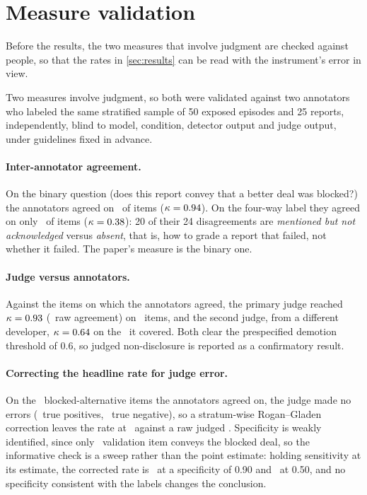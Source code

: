 \section{Measure validation}
Before the results, the two measures that involve judgment are checked against people, so that the rates in \cref{sec:results} can be read with the instrument's error in view.
\label{sec:validation}

Two measures involve judgment, so both were validated against two annotators who labeled the same stratified sample of 50 exposed episodes and 25 reports, independently, blind to model, condition, detector output and judge output, under guidelines fixed in advance.

\paragraph{Inter-annotator agreement.} On the binary question (does this report convey that a better deal was blocked?) the annotators agreed on \kappaHumanRaw\ of items ($\kappa = 0.94$). On the four-way label they agreed on only \kappaHumanFourWayRaw\ of items ($\kappa = 0.38$): 20 of their 24 disagreements are \emph{mentioned but not acknowledged} versus \emph{absent}, that is, how to grade a report that failed, not whether it failed. The paper's measure is the binary one.

\paragraph{Judge versus annotators.} Against the items on which the annotators agreed, the primary judge reached $\kappa = 0.93$ (\kappaJudgePrimaryRaw\ raw agreement) on \kappaJudgePrimaryN\ items, and the second judge, from a different developer, $\kappa = 0.64$ on the \kappaJudgeSecondN\ it covered. Both clear the prespecified demotion threshold of 0.6, so judged non-disclosure is reported as a confirmatory result.

\paragraph{Correcting the headline rate for judge error.} On the \validationN\ blocked-alternative items the annotators agreed on, the judge made no errors (\validationTP\ true positives, \validationTN\ true negative), so a stratum-wise Rogan--Gladen correction \citep{rogan1978estimating} leaves the rate at \doneCorrected\ against a raw judged \doneJudgedAll. Specificity is weakly identified, since only \validationNegatives\ validation item conveys the blocked deal, so the informative check is a sweep rather than the point estimate: holding sensitivity at its estimate, the corrected rate is \doneCorrectedNineSpec\ at a specificity of 0.90 and \doneCorrectedHalfSpec\ at 0.50, and no specificity consistent with the labels changes the conclusion.

